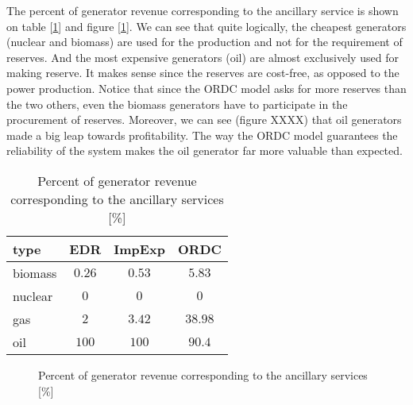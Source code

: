 
The percent of generator revenue corresponding to the ancillary service is shown on table [\ref{pourcentage}] and figure [\ref{pourcent}]. We can see that quite logically, the cheapest generators (nuclear and biomass) are used for the production and not for the requirement of reserves. And the most expensive generators (oil) are almost exclusively used for making reserve. It makes sense since the reserves are cost-free, as opposed to the power production. Notice that since the ORDC model asks for more reserves than the two others, even the biomass generators have to participate in the procurement of reserves. Moreover, we can see (figure XXXX) that oil generators made a big leap towards profitability. The way the ORDC model guarantees the reliability of the system makes the oil generator far more valuable than expected.
 
\begin{table}[H]
\centering
\begin{tabular}{l | c  c  c}
type & EDR & ImpExp & ORDC \\
\hline
biomass &  $0.26$ & $0.53$ & $5.83$ \\
nuclear & $0$ & $0$ & $0$ \\
gas & $2$ & $3.42$ & $38.98$ \\
oil & $100$ & $100$ & $90.4$ \\
\end{tabular}
\caption{Percent of generator revenue corresponding to the ancillary services [\%]}
\label{pourcentage}
\end{table} 
 
\begin{figure}[H]
    \centering
    \setlength\fheight{4cm}
    \setlength{}
    
    \caption{Percent of generator revenue corresponding to the ancillary services [\%]}
    \label{pourcent}
\end{figure}
